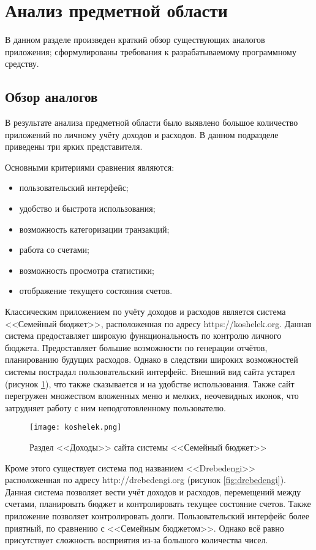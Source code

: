 \section{Анализ предметной области}

В данном разделе произведен краткий обзор существующих аналогов приложения;
сформулированы требования к разрабатываемому программному средству.

\subsection{Обзор аналогов}

В результате анализа предметной области было выявлено большое количество приложений
по личному учёту доходов и расходов.
В данном подразделе приведены три ярких представителя.

Основными критериями сравнения являются:
\begin{itemize}
\item пользовательский интерфейс;
\item удобство и быстрота использования;
\item возможность категоризации транзакций;
\item работа со счетами;
\item возможность просмотра статистики;
\item отображение текущего состояния счетов.
\end{itemize}

Классическим приложением по учёту доходов и расходов является система
<<Семейный бюджет>>, расположенная по адресу https://koshelek.org.
Данная система предоставляет широкую функциональность по контролю личного бюджета.
Предоставляет большие возможности по генерации отчётов, планированию будущих расходов.
Однако в следствии широких возможностей системы пострадал пользовательский интерфейс.
Внешний вид сайта устарел (рисунок \ref{fig:koshelek}), что также сказывается и на
удобстве использования. Также сайт перегружен множеством вложенных меню и мелких,
неочевидных иконок, что затрудняет работу с ним неподготовленному пользователю.

\begin{figure}[p]
\centering
\texttt{[image: koshelek.png]}
\caption{Раздел <<Доходы>> сайта системы <<Семейный бюджет>>}
\label{fig:koshelek}
\end{figure}

Кроме этого существует система под названием <<Drebedengi>> расположенная по адресу
http://drebedengi.org (рисунок \ref{fig:drebedengi}). Данная система позволяет
вести учёт доходов и расходов, перемещений между счетами, планировать бюджет
и контролировать текущее состояние счетов. Также приложение позволяет
контролировать долги. Пользовательский интерфейс более приятный, по сравнению с
<<Семейным бюджетом>>. Однако всё равно присутствует сложность восприятия из-за
большого количества чисел.

